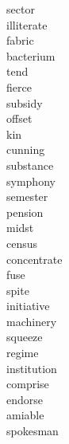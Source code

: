 \documentclass[a4paper, 11pt]{ctexart}
\begin{document}
\begin{multicols*}{3}
\begin{description}
\item[sector]

\item[illiterate]

\item[fabric]

\item[bacterium]

\item[tend]

\item[fierce]

\item[subsidy]

\item[offset]

\item[kin]

\item[cunning]

\item[substance]

\item[symphony]

\item[semester]

\item[pension]

\item[midst]

\item[census]

\item[concentrate]

\item[fuse]

\item[spite]

\item[initiative]

\item[machinery]

\item[squeeze]

\item[regime]

\item[institution]

\item[comprise]

\item[endorse]

\item[amiable]

\item[spokesman]


\end{description}
\end{multicols*}
\end{document}
